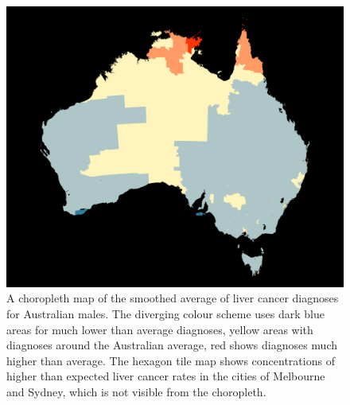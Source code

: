 \documentclass{monashthesis}
\begin{document}
\begin{figure}[H]
\centering
\includegraphics[width=16cm]{figures/04-experiment/aus_liver_m.pdf}
\caption{\label{fig:liver-geo}A choropleth map of the smoothed average of liver cancer diagnoses for Australian males. The diverging colour scheme uses dark blue areas for much lower than average diagnoses, yellow areas with diagnoses around the Australian average, red shows diagnoses much higher than average. The hexagon tile map shows concentrations of higher than expected liver cancer rates in the cities of Melbourne and Sydney, which is not visible from the choropleth.}
\end{figure}
\end{document}
